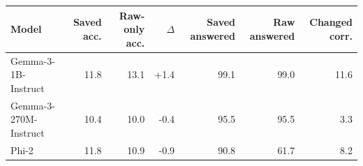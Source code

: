 \begin{tabular}{lrrrrrr}
\toprule
Model & Saved acc. & Raw-only acc. & $\Delta$ & Saved answered & Raw answered & Changed corr. \\
\midrule
Gemma-3-1B-Instruct & 11.8 & 13.1 & +1.4 & 99.1 & 99.0 & 11.6 \\
Gemma-3-270M-Instruct & 10.4 & 10.0 & -0.4 & 95.5 & 95.5 & 3.3 \\
Phi-2 & 11.8 & 10.9 & -0.9 & 90.8 & 61.7 & 8.2 \\
\bottomrule
\end{tabular}
